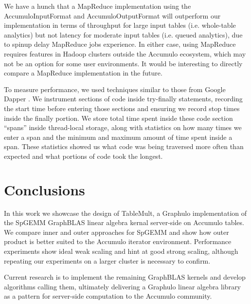 We have a hunch that a MapReduce implementation using the AccumuloInputFormat and AccumuloOutputFormat 
will outperform our implementation in terms of throughput for large input tables (i.e. whole-table analytics)
but not latency for moderate input tables (i.e. queued analytics), due to spinup delay MapReduce jobs experience.
In either case, using MapReduce requires features in Hadoop clusters outside the 
Accumulo ecosystem, which may not be an option for some user environments.
It would be interesting to directly compare a MapReduce implementation in the future.



To measure performance, we used techniques similar to those from Google Dapper \cite{sigelman2010dapper}.
We instrument sections of code inside try-finally statements, recording the start time before 
entering those sections and ensuring we record stop times inside the finally portion.
We store total time spent inside these code section ``spans'' inside thread-local storage,
along with statistics on how many times we enter a span and the minimum and maximum amount of time
spent inside a span. These statistics showed us what code was being traversed more often than expected
and what portions of code took the longest. 

\section{Conclusions}
\label{sConclusions}

In this work we showcase the design of TableMult, a Graphulo implementation of the 
SpGEMM GraphBLAS linear algebra kernal server-side on Accumulo tables.
We compare inner and outer approaches for SpGEMM and show how outer product is better
suited to the Accumulo iterator environment.
Performance experiments show ideal weak scaling and hint at good strong scaling,
although repeating our experiments on a larger cluster is necessary to confirm.

Current research is to implement the remaining GraphBLAS kernels 
and develop algorithms calling them, %
ultimately delivering a Graphulo linear algebra library 
as a pattern for server-side computation
to the Accumulo community.

